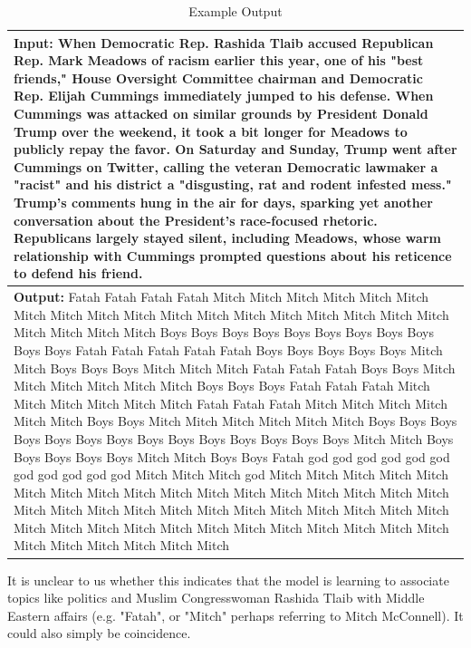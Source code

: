 \documentclass[11pt]{article}
\begin{document}
\begin{table}[h!]
\centering
\begin{tiny}
\begin{tabular}{|p{7cm}|} 
 \hline
 \textbf{Input:} When Democratic Rep. Rashida Tlaib accused Republican Rep. Mark Meadows of racism earlier this year, one of his "best friends," House Oversight Committee chairman and Democratic Rep. Elijah Cummings immediately jumped to his defense. When Cummings was attacked on similar grounds by President Donald Trump over the weekend, it took a bit longer for Meadows to publicly repay the favor. On Saturday and Sunday, Trump went after Cummings on Twitter, calling the veteran Democratic lawmaker a "racist" and his district a "disgusting, rat and rodent infested mess." Trump's comments hung in the air for days, sparking yet another conversation about the President's race-focused rhetoric. Republicans largely stayed silent, including Meadows, whose warm relationship with Cummings prompted questions about his reticence to defend his friend. \\ [0.5ex] 
 \hline
 \textbf{Output:} Fatah Fatah Fatah Fatah Mitch Mitch Mitch Mitch Mitch Mitch Mitch Mitch Mitch Mitch Mitch Mitch Mitch Mitch Mitch Mitch Mitch Mitch Mitch Mitch Mitch Mitch Boys Boys Boys Boys Boys Boys Boys Boys Boys Boys Boys Fatah Fatah Fatah Fatah Fatah Boys Boys Boys Boys Boys Mitch Mitch Boys Boys Boys Mitch Mitch Mitch Fatah Fatah Fatah Boys Boys Mitch Mitch Mitch Mitch Mitch Mitch Boys Boys Boys Fatah Fatah Fatah Mitch Mitch Mitch Mitch Mitch Mitch Fatah Fatah Fatah Mitch Mitch Mitch Mitch Mitch Mitch Boys Boys Mitch Mitch Mitch Mitch Mitch Mitch Boys Boys Boys Boys Boys Boys Boys Boys Boys Boys Boys Boys Boys Boys Mitch Mitch Boys Boys Boys Boys Boys Mitch Mitch Boys Boys Fatah god god god god god god god god god god god Mitch Mitch Mitch god Mitch Mitch Mitch Mitch Mitch Mitch Mitch Mitch Mitch Mitch Mitch Mitch Mitch Mitch Mitch Mitch Mitch Mitch Mitch Mitch Mitch Mitch Mitch Mitch Mitch Mitch Mitch Mitch Mitch Mitch Mitch Mitch Mitch Mitch Mitch Mitch Mitch Mitch Mitch Mitch Mitch Mitch Mitch Mitch Mitch Mitch Mitch  \\ 
 \hline
\end{tabular}
\end{tiny}
\caption{Example Output}
\label{table:3}
\end{table}

It is unclear to us whether this indicates that the model is learning to associate topics like politics and Muslim Congresswoman Rashida Tlaib with Middle Eastern affairs (e.g. "Fatah", or "Mitch" perhaps referring to Mitch McConnell). It could also simply be coincidence.
\end{document}
